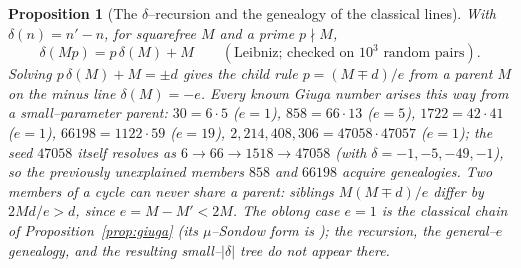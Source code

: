 \documentclass[11pt]{article}
\newtheorem{proposition}[theorem]{Proposition}
\theoremstyle{definition}
\begin{document}
\begin{proposition}[The $\delta$--recursion and the genealogy of the classical lines]\label{prop:delta}
With $\delta(n)=n'-n$, for squarefree $M$ and a prime $p\nmid M$,
\[ \delta(Mp)=p\,\delta(M)+M \qquad(\text{Leibniz; checked on }10^3\text{ random pairs}). \]
Solving $p\,\delta(M)+M=\pm d$ gives the child rule $p=(M\mp d)/e$ from a parent $M$ on the minus line
$\delta(M)=-e$. Every known Giuga number arises this way from a small--parameter parent: $30=6\cdot5$
($e=1$), $858=66\cdot13$ ($e=5$), $1722=42\cdot41$ ($e=1$), $66198=1122\cdot59$ ($e=19$),
$2{,}214{,}408{,}306=47058\cdot47057$ ($e=1$); the seed $47058$ itself resolves as $6\to66\to1518\to47058$
(with $\delta=-1,-5,-49,-1$), so the previously unexplained members $858$ and $66198$ acquire genealogies.
Two members of a cycle can never share a parent: siblings $M(M\mp d)/e$ differ by $2Md/e>d$, since
$e=M-M'<2M$. The oblong case $e=1$ is the classical chain of Proposition~\ref{prop:giuga} (its
$\mu$--Sondow form is \cite{GrauOllerMarcenSadornil2021}); the recursion, the general--$e$ genealogy, and the
resulting small--$|\delta|$ tree do not appear there.
\end{proposition}
\end{document}
